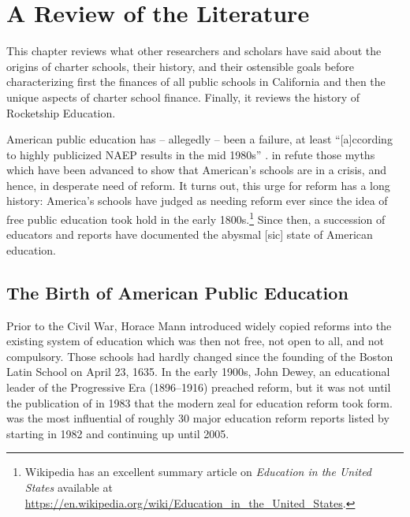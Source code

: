 
\chapter{A Review of the Literature}\label{ch:litreview}
\bigskip%
This chapter reviews what other researchers and scholars have said about the origins of charter schools, their history, and their ostensible goals before characterizing first the finances of all public schools in California and then the unique aspects of charter school finance. Finally, it reviews the history of Rocketship Education.

American public education has – allegedly – been a failure, at least ``[a]ccording to highly publicized NAEP results in the mid 1980s'' \parencite{Gove.Meier2000}. \textcite{Berliner.Glass2014} in  refute those myths which have been advanced to show that American's schools are in a crisis, and hence, in desperate need of reform. It turns out, this urge for reform has a long history: America's schools have judged as needing reform ever since the idea of free public education took hold in the early 1800s.\footnote{Wikipedia has an excellent summary article on \textit{Education in the United States} available at \url{https://en.wikipedia.org/wiki/Education_in_the_United_States}.} Since then, a succession of educators and reports have documented the abysmal [sic] state of American education.

\section{The Birth of American Public Education}\label{sec:birth-amer-publ}\indent

Prior to the Civil War, Horace Mann introduced widely copied reforms \parencite%
{Pulliam.VanPatten2007} into the existing system of education which was then not free, not open to all, and not compulsory. Those schools had hardly changed since the founding of the Boston Latin School on April 23, 1635. In the early 1900s, John Dewey, an educational leader of the Progressive Era (1896–1916) preached reform, but it was not until the publication of  in 1983 that the modern zeal for education reform took form.  was the most influential of roughly 30  major education reform reports listed by \textcite{Pulliam.VanPatten2007} starting in 1982 and continuing up until 
2005.

